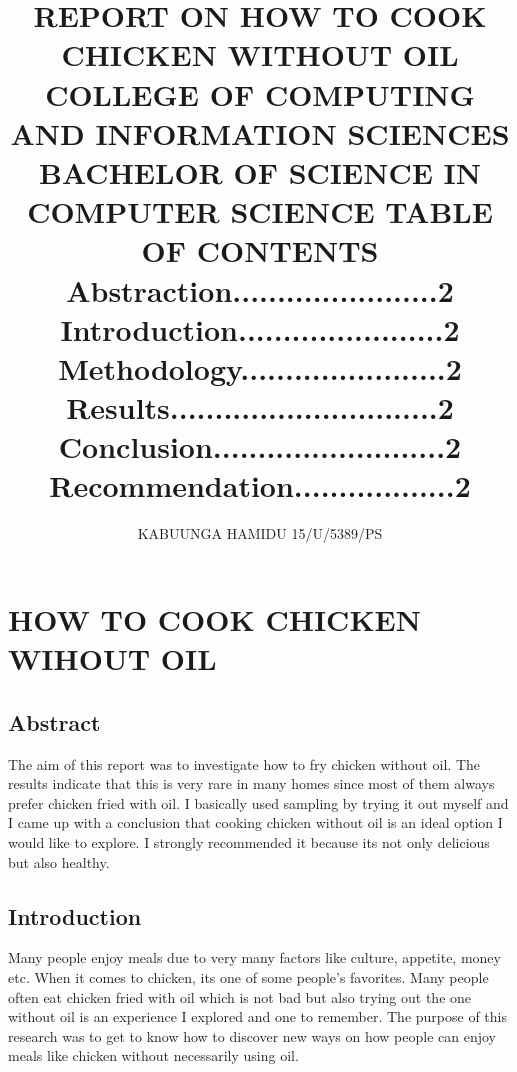 \documentclass[10pt]{report}
\begin{document}
\title{
 {REPORT ON HOW TO COOK CHICKEN WITHOUT OIL}\\
{\large  COLLEGE OF COMPUTING AND INFORMATION SCIENCES}\\
{\large BACHELOR OF SCIENCE IN COMPUTER SCIENCE}
{TABLE OF CONTENTS}\\
{\large Abstraction.......................2}\\
{\large Introduction.......................2}\\
{\large Methodology.......................2}\\
{\large Results..............................2}\\
{\large Conclusion..........................2}\\
{\large Recommendation..................2}}

\author {
{\large KABUUNGA HAMIDU}
{15/U/5389/PS}}





\maketitle
\section{HOW TO COOK CHICKEN WIHOUT OIL}

\subsection{Abstract}
	{The aim of this report was to investigate how to fry chicken without oil. The results indicate that this is very rare in many homes since most of them always prefer chicken fried with oil. I basically used sampling by trying it out myself and I came up with a conclusion that cooking chicken without oil is an ideal option I would like to explore. I strongly recommended it because its not only delicious but also healthy.}
\subsection{Introduction}
{Many people enjoy meals due to very many factors like culture, appetite, money etc. When it comes to chicken, its one of some people’s favorites. Many people often eat chicken fried with oil which is not bad but also trying out the one without oil is an experience I explored and one to remember. 
The purpose of this research was to get to know how to discover new ways on how people can enjoy meals like chicken without necessarily using oil.}
\end{document}
